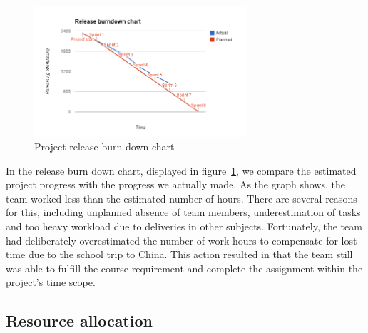 \begin{figure}[H]
\centering
\includegraphics[width=0.7\textwidth, clip, trim=1.1cm 0.5cm 1.2cm 1cm]{ch/retrospect/fig/release.png}
\caption{Project release burn down chart}
\label{fig:release}
\end{figure}

\noindent In the release burn down chart, displayed in figure~\ref{fig:release}, we compare the estimated project progress with the progress we actually made. As the graph shows, the team worked less than the estimated number of hours. There are several reasons for this, including unplanned absence of team members, underestimation of tasks and too heavy workload due to deliveries in other subjects. Fortunately, the team had deliberately overestimated the number of work hours to compensate for lost time due to the school trip to China. This action resulted in that the team still was able to fulfill the course requirement and complete the assignment within the project's time scope.


\subsection{Resource allocation}
